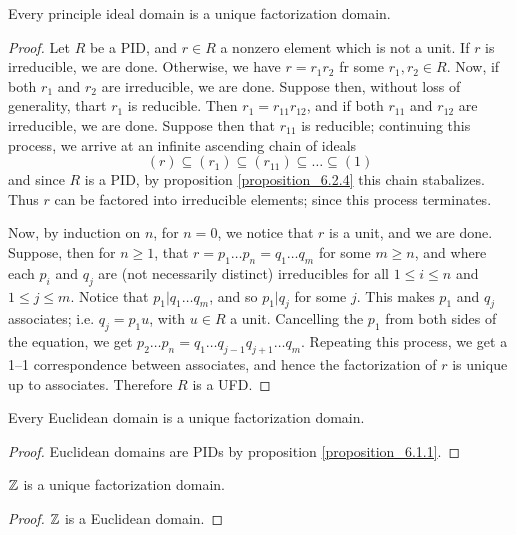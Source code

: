 \begin{theorem}\label{proposition_6.3.5}
  Every principle ideal domain is a unique factorization domain.
\end{theorem}
\begin{proof}
  Let $R$ be a PID, and  $r \in R$ a nonzero element which is not a unit. If
  $r$ is irreducible, we are done. Otherwise, we have  $r=r_1r_2$ fr some
  $r_1,r_2 \in R$. Now, if both $r_1$ and $r_2$ are irreducible, we are done.
  Suppose then, without loss of generality, thart $r_1$ is reducible. Then
  $r_1=r_{11}r_{12}$, and if both $r_{11}$ and $r_{12}$ are irreducible, we
  are done. Suppose then that $r_{11}$ is reducible; continuing this process,
  we arrive at an infinite ascending chain of ideals
  \begin{equation*}
    (r) \subseteq (r_1) \subseteq (r_{11}) \subseteq \dots \subseteq (1)
  \end{equation*}
  and since $R$ is a PID, by proposition \ref{proposition_6.2.4} this chain stabalizes. Thus
  $r$ can be factored into irreducible elements; since this process terminates.

  Now, by induction on $n$, for  $n=0$, we notice that  $r$ is a unit, and we
  are done. Suppose, then for  $n \geq 1$, that  $r=p_1 \dots p_n=q_1 \dots
  q_m$ for some $m \geq n$, and where each  $p_i$ and  $q_j$ are  (not
  necessarily distinct) irreducibles for all $1 \leq i \leq n$ and $1 \leq j
  \leq m$. Notice that  $p_1|q_1 \dots q_m$, and so $p_1|q_j$ for some $j$.
  This makes  $p_1$ and $q_j$ associates; i.e.  $q_j=p_1u$, with $u \in R$ a
  unit. Cancelling the  $p_1$ from both sides of the equation, we get $p_2
  \dots p_n=q_1 \dots q_{j-1}q_{j+1} \dots q_m$. Repeating this process, we
  get a 1--1 correspondence between associates, and hence the factorization of
  $r$ is unique up to associates. Therefore  $R$ is a UFD.
\end{proof}
\begin{corollary}
  Every Euclidean domain is a unique factorization domain.
\end{corollary}
\begin{proof}
  Euclidean domains are PIDs by proposition \ref{proposition_6.1.1}.
\end{proof}
\begin{corollary}
  $\mathbb{Z}$ is a unique factorization domain.
\end{corollary}
\begin{proof}
  $\mathbb{Z}$ is a Euclidean domain.
\end{proof}
